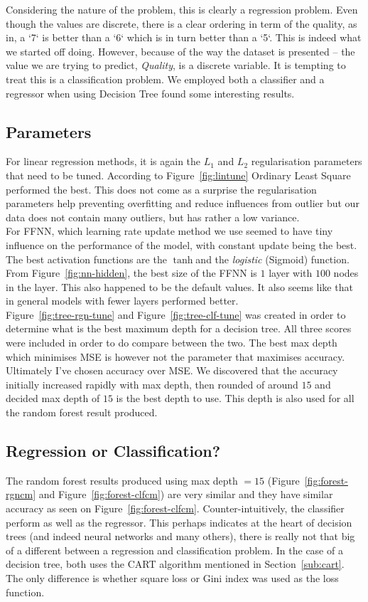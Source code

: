 \documentclass[english,notitlepage,reprint,nofootinbib]{revtex4-1}
\begin{document}
Considering the nature of the problem, this is clearly a regression problem. Even though the values are discrete, there is a clear ordering in term of the quality, as in, a `7` is better than a `6` which is in turn better than a `5`. This is indeed what we started off doing. However, because of the way the dataset is presented -- the value we are trying to predict, \textit{Quality}, is a discrete variable. It is tempting to treat this is a classification problem. We employed both a classifier and a regressor when using Decision Tree found some interesting results.


\subsection{Parameters}
For linear regression methods, it is again the $ L_1 $ and $ L_2 $ regularisation parameters that need to be tuned. According to Figure~\ref{fig:lintune} Ordinary Least Square performed the best. This does not come as a surprise the regularisation parameters help preventing overfitting and reduce influences from outlier but our data does not contain many outliers, but has rather a low variance.  \\
For FFNN, which learning rate update method we use seemed to have tiny influence on the performance of the model, with constant update being the best. The best activation functions are the $ \tanh $and the \textit{logistic} (Sigmoid) function. From Figure~\ref{fig:nn-hidden}, the best size of the FFNN is $ 1 $ layer with $ 100 $ nodes in the layer. This also happened to be the default values. It also seems like that in general models with fewer layers performed better. \\
Figure~\ref{fig:tree-rgn-tune} and Figure~\ref{fig:tree-clf-tune} was created in order to determine what is the best maximum depth for a decision tree. All three scores were included in order to do compare between the two. The best max depth which minimises MSE is however not the parameter that maximises accuracy. Ultimately I've chosen accuracy over MSE. We discovered that the accuracy initially increased rapidly with max depth, then rounded of around $ 15 $ and decided max depth of $ 15 $ is the best depth to use. This depth is also used for all the random forest result produced.


\subsection{Regression or Classification?}
The random forest results produced using max depth $ =15 $ (Figure~\ref{fig:forest-rgncm} and
Figure~\ref{fig:forest-clfcm}) are very similar and they have similar accuracy as seen on Figure~\ref{fig:forest-clfcm}. Counter-intuitively, the classifier perform as well as the regressor. This perhaps indicates at the heart of decision trees (and indeed neural networks and many others), there is really not that big of a different between a regression and classification problem. In the case of a decision tree, both uses the CART algorithm mentioned in Section~\ref{sub:cart}. The only difference is whether square loss or Gini index was used as the loss function. 
\end{document}
